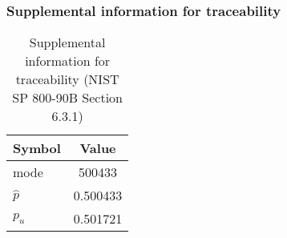 \documentclass[a3paper,xelatex,english]{bxjsarticle}
\begin{document}
\subsubsection{Supplemental information for traceability}
\renewcommand{\arraystretch}{1.8}
\begin{table}[h]
\caption{Supplemental information for traceability (NIST SP 800-90B Section 6.3.1)}
\begin{center}
\begin{tabular}{|l|c|}
\hline 
\rowcolor{anotherlightblue} %
Symbol				& Value \\ \hline 
mode				&   500433\\ \hline 
$\hat{p}$ 			& 0.500433\\ \hline
$p_u$				& 0.501721\\ \hline
\end{tabular}
\end{center}
\end{table}
\renewcommand{\arraystretch}{1.4}
\clearpage
\end{document}

